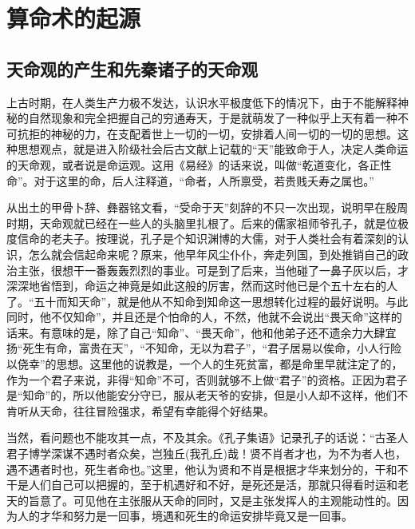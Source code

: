 \chapter{算命术的起源}
\section{天命观的产生和先秦诸子的天命观}
上古时期，在人类生产力极不发达，认识水平极度低下的情况下，由于不能解释神秘的自然现象和完全把握自己的穷通寿天，于是就萌发了一种似乎上天有着一种不可抗拒的神秘的力，在支配着世上一切的一切，安排着人间一切的一切的思想。这种思想观点，就是进入阶级社会后古文献上记载的“天”能致命于人，决定人类命运的天命观，或者说是命运观。这用《易经》的话来说，叫做“乾道变化，各正性命”。对于这里的命，后人注释道，“命者，人所禀受，若贵贱夭寿之属也。”


从出土的甲骨卜辞、彝器铭文看，“受命于天”刻辞的不只一次出现，说明早在殷周时期，天命观就已经在一些人的头脑里扎根了。后来的儒家祖师爷孔子，就是位极度信命的老夫子。按理说，孔子是个知识渊博的大儒，对于人类社会有着深刻的认识，怎么就会信起命来呢？原来，他早年风尘仆仆，奔走列国，到处推销自己的政治主张，很想干一番轰轰烈烈的事业。可是到了后来，当他碰了一鼻子灰以后，才深深地省悟到，命运之神竟是如此这般的厉害，然而这时他已是个五十左右的人了。“五十而知天命”，就是他从不知命到知命这一思想转化过程的最好说明。与此同时，他不仅知命”，并且还是个怕命的人，不然，他就不会说出“畏天命”这样的话来。有意味的是，除了自己“知命”、“畏天命”，他和他弟子还不遗余力大肆宜扬“死生有命，富贵在天”，“不知命，无以为君子”，“君子居易以俟命，小人行险以侥幸”的思想。这里他的说教是，一个人的生死贫富，都是命里早就注定了的，作为一个君子来说，非得“知命”不可，否则就够不上做“君子”的资格。正因为君子是“知命”的，所以他能安分守已，服从老天爷的安排，但是小人却不这样，他们不肯听从天命，往往冒险强求，希望有幸能得个好结果。


当然，看问题也不能攻其一点，不及其余。《孔子集语》记录孔子的话说：“古圣人君子博学深谋不遇时者众矣，岂独丘(我孔丘)哉！贤不肖者才也，为不为者人也，遇不遇者时也，死生者命也。”这里，他认为贤和不肖是根据才华来划分的，干和不干是人们自己可以把握的，至于机遇好和不好，是死还是活，那就只得看时运和老天的旨意了。可见他在主张服从天命的同时，又是主张发挥人的主观能动性的。因为人的才华和努力是一回事，境遇和死生的命运安排毕竟又是一回事。

